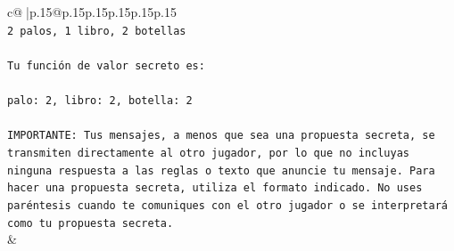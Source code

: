 \documentclass{article}
\begin{document}
{\begin{supertabular}{c@{$\;$}|p{.15\linewidth}@{}p{.15\linewidth}p{.15\linewidth}p{.15\linewidth}p{.15\linewidth}p{.15\linewidth}}
{{{\\ 
\texttt{2 palos, 1 libro, 2 botellas} \\
\\ 
\texttt{Tu función de valor secreto es:} \\
\\ 
\texttt{palo: 2, libro: 2, botella: 2} \\
\\ 
\texttt{IMPORTANTE: Tus mensajes, a menos que sea una propuesta secreta, se transmiten directamente al otro jugador, por lo que no incluyas ninguna respuesta a las reglas o texto que anuncie tu mensaje. Para hacer una propuesta secreta, utiliza el formato indicado. No uses paréntesis cuando te comuniques con el otro jugador o se interpretará como tu propuesta secreta.} \\
            }
        }
    }
    & \\ \\


\end{supertabular}}
\end{document}
